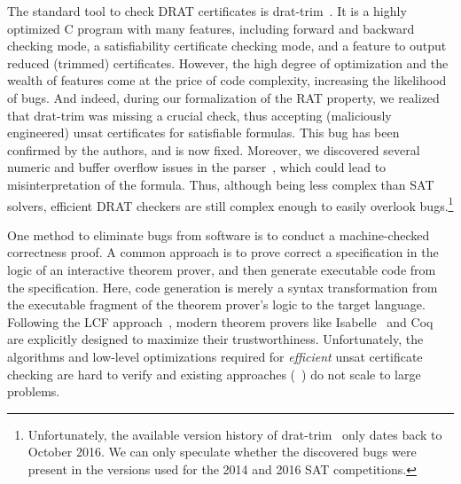 \documentclass{llncs}
\begin{document}
The standard tool to check DRAT certificates is drat-trim~\cite{WHH14,drat-trim-webpage}. 
It is a highly optimized C program with many features, including forward and backward checking mode, a satisfiability certificate checking mode,
and a feature to output reduced (trimmed) certificates.
% 
% 
However, the high degree of optimization and the wealth of features come at the price of code complexity, increasing the likelihood of bugs. And indeed, 
during our formalization of the RAT property, we realized that drat-trim was missing a crucial check, thus accepting (maliciously engineered) unsat certificates 
for satisfiable formulas. This bug has been confirmed by the authors, and is now fixed.
Moreover, we discovered several numeric and buffer overflow issues in the parser~\cite{drat-trim-issues}, which could lead to misinterpretation of the formula.
Thus, although being less complex than SAT solvers, efficient DRAT checkers are still complex enough to easily overlook bugs.\footnote{Unfortunately, the available version history of drat-trim~\cite{drat-trim-github} only dates back to October 2016. We can only speculate whether the discovered bugs were present in the versions used for the 2014 and 2016 SAT competitions.} 

One method to eliminate bugs from software is to conduct a machine-checked correctness proof. 
A common approach is to prove correct a specification in the logic of an interactive theorem prover, and then generate executable code from 
the specification. Here, code generation is merely a syntax transformation from the executable fragment of the theorem prover's logic to the target language.
Following the LCF approach~\cite{Gord00}, modern theorem provers like Isabelle~\cite{NPW02} and Coq~\cite{BeCa10} are explicitly designed to maximize their trustworthiness.
Unfortunately, the algorithms and low-level optimizations required for \emph{efficient} unsat certificate checking are 
hard to verify and existing approaches (\eg~\cite{DFM10,WHH13}) do not scale to large problems.
\end{document}
